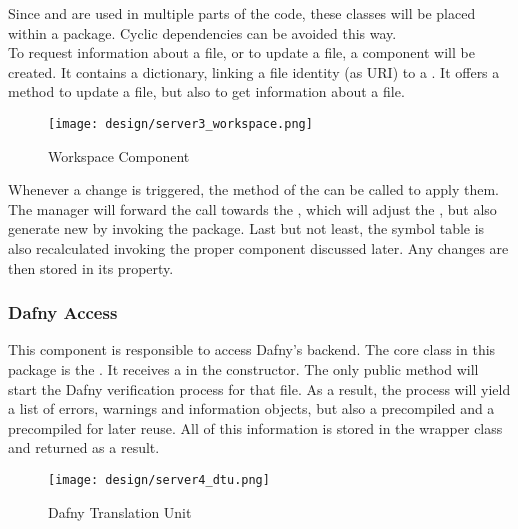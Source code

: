 Since  and  are used in multiple parts of the code, these classes will be placed within a  package.
Cyclic dependencies can be avoided this way.\\

To request information about a file, or to update a file, a component  will be created.
It contains a dictionary, linking a file identity (as URI) to a . 
It offers a method to update a file, but also to get information about a file.\\

\begin{figure}[ht]
    \centering
    \texttt{[image: design/server3\_workspace.png]}
    \caption{Workspace Component}
    \label{fig:server_workspace}
\end{figure}

Whenever a change is triggered, the  method of the  can be called to apply them.
The manager will forward the call towards the , which will adjust the \linebreak {},
but also generate new  by invoking the  package.
Last but not least, the symbol table is also recalculated invoking the proper component discussed later.
Any changes are then stored in its  property.\\

\subsubsection{Dafny Access}
This component is responsible to access Dafny's backend.
The core class in this package is the \linebreak {}.
It receives a  in the constructor.
The only public method  will start the Dafny verification process for that file.
As a result, the process will yield a list of errors, warnings and information objects, but also a precompiled  and a precompiled  for later reuse.
All of this information is stored in the  wrapper class and returned as a result.\\

\begin{figure}[H]
    \centering
    \texttt{[image: design/server4\_dtu.png]}
    \caption{Dafny Translation Unit}
    \label{fig:server_dtu}
\end{figure}


